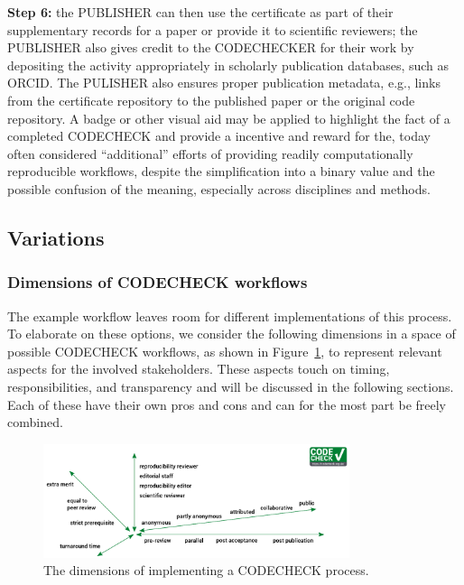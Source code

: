 \documentclass[12pt]{article}
\begin{document}
\textbf{Step 6:} the PUBLISHER can then use the certificate as part of their
supplementary records for a paper or provide it to scientific reviewers; the
PUBLISHER also gives credit to the CODECHECKER for their work by depositing the
activity appropriately in scholarly publication databases, such as ORCID.
The PULISHER also ensures proper publication metadata, e.g., links from the 
certificate repository to the published paper or the original code repository.
A badge or other visual aid may be applied to highlight the fact of a completed
CODECHECK and provide a incentive and reward for the, today often considered
``additional'' efforts of providing readily computationally reproducible workflows,
despite the simplification into a binary value and the possible confusion of
the meaning, especially across disciplines and methods.

\subsection*{Variations}\label{variations}

\subsubsection*{Dimensions of CODECHECK workflows}\label{dimensions-of-workflows}

The example workflow leaves room for different
implementations of this process. To elaborate on these options, we consider
the following dimensions in a space of possible CODECHECK workflows, as shown in 
Figure~\ref{fig:dimensions}, to represent relevant aspects for the involved
stakeholders. These aspects touch on timing, responsibilities, and 
transparency and will be discussed in the following sections.
Each of these have their own pros and cons and can for the most part be
freely combined.

\begin{figure}
  \centering
      \includegraphics[width=0.8\textwidth]{figs/codecheck_dimensions.pdf}
  \caption{The dimensions of implementing a CODECHECK process.}
  \label{fig:dimensions}
\end{figure}
\end{document}
